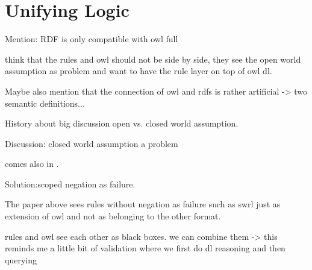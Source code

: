 % 
% 
% 
% 
% 
% 

\section{Unifying Logic}

Mention: RDF is only compatible with owl full

\cite{twotowers} think that the rules and owl should not be side by side, they see the open world assumption as problem and want to have the rule layer on top of owl dl.

Maybe also mention that the connection of owl and rdfs is rather artificial -> two semantic definitions...


History about big discussion open vs. closed world assumption.

Discussion: closed world assumption a problem

comes also in \cite{rearch}.

Solution:scoped negation as failure.

The paper above sees rules without negation as failure such as swrl just as extension of owl and not as belonging to the other format.

rules and owl see each other as black boxes.
we can combine them
-> this reminds me a little bit of validation where we first do dl reasoning and then querying

